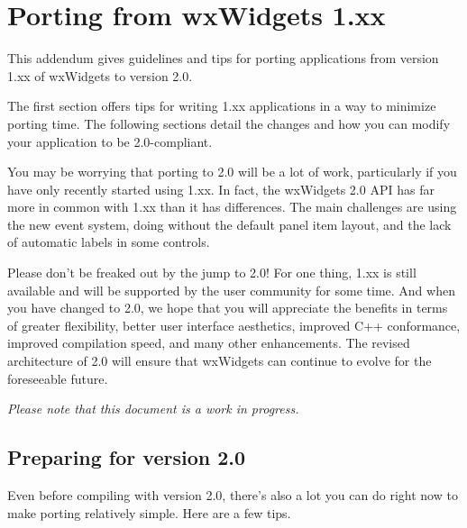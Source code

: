 \chapter{Porting from wxWidgets 1.xx}\label{porting}

This addendum gives guidelines and tips for porting applications from
version 1.xx of wxWidgets to version 2.0.

The first section offers tips for writing 1.xx applications in a way to
minimize porting time. The following sections detail the changes and
how you can modify your application to be 2.0-compliant.

You may be worrying that porting to 2.0 will be a lot of work,
particularly if you have only recently started using 1.xx. In fact,
the wxWidgets 2.0 API has far more in common with 1.xx than it has differences.
The main challenges are using the new event system, doing without the default
panel item layout, and the lack of automatic labels in some controls.

Please don't be freaked out by the jump to 2.0! For one thing, 1.xx is still available
and will be supported by the user community for some time. And when you have
changed to 2.0, we hope that you will appreciate the benefits in terms
of greater flexibility, better user interface aesthetics, improved C++ conformance,
improved compilation speed, and many other enhancements. The revised architecture
of 2.0 will ensure that wxWidgets can continue to evolve for the foreseeable
future.

{\it Please note that this document is a work in progress.}

\section{Preparing for version 2.0}\label{portingpreparing}

Even before compiling with version 2.0, there's also a lot you can do right now to make porting
relatively simple. Here are a few tips.

